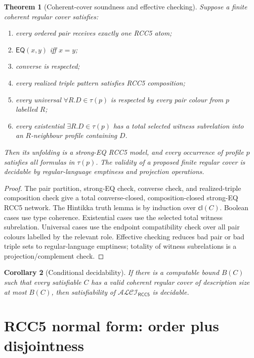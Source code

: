 \documentclass[11pt]{article}
\newtheorem{theorem}{Theorem}[section]
\newtheorem{corollary}[theorem]{Corollary}
\newcommand{\EQ}{\mathsf{EQ}}
\newcommand{\cl}{\mathsf{cl}}
\newcommand{\ALCI}{\mathcal{ALCI}_{\mathsf{RCC5}}}
\begin{document}
\begin{theorem}[Coherent-cover soundness and effective checking]\label{thm:coherent-soundness}
Suppose a finite coherent regular cover satisfies:
\begin{enumerate}
\item every ordered pair receives exactly one RCC5 atom;
\item $\EQ(x,y)$ iff $x=y$;
\item converse is respected;
\item every realized triple pattern satisfies RCC5 composition;
\item every universal $\forall R.D\in\tau(p)$ is respected by every pair colour from $p$ labelled $R$;
\item every existential $\exists R.D\in\tau(p)$ has a total selected witness subrelation into an $R$-neighbour profile containing $D$.
\end{enumerate}
Then its unfolding is a strong-EQ RCC5 model, and every occurrence of profile $p$ satisfies all formulas in $\tau(p)$.  The validity of a proposed finite regular cover is decidable by regular-language emptiness and projection operations.
\end{theorem}

\begin{proof}
The pair partition, strong-EQ check, converse check, and realized-triple composition check give a total converse-closed, composition-closed strong-EQ RCC5 network.  The Hintikka truth lemma is by induction over $\cl(C)$.  Boolean cases use type coherence.  Existential cases use the selected total witness subrelation.  Universal cases use the endpoint compatibility check over all pair colours labelled by the relevant role.  Effective checking reduces bad pair or bad triple sets to regular-language emptiness; totality of witness subrelations is a projection/complement check.
\end{proof}

\begin{corollary}[Conditional decidability]
If there is a computable bound $B(C)$ such that every satisfiable $C$ has a valid coherent regular cover of description size at most $B(C)$, then satisfiability of $\ALCI$ is decidable.
\end{corollary}

\section{RCC5 normal form: order plus disjointness}
\end{document}
